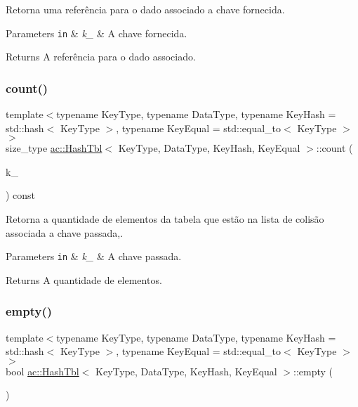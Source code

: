 Retorna uma referência para o dado associado a chave fornecida. 


\begin{DoxyParams}[1]{Parameters}
\mbox{\tt in}  & {\em k\+\_\+} & A chave fornecida.\\
\hline
\end{DoxyParams}
\begin{DoxyReturn}{Returns}
A referência para o dado associado. 
\end{DoxyReturn}
\mbox{\label{classac_1_1HashTbl_ae5dd7b78ebf842dfb67db7005c519479}} 
\subsubsection{\texorpdfstring{count()}{count()}}
{\footnotesize\ttfamily template$<$typename Key\+Type, typename Data\+Type, typename Key\+Hash = std\+::hash$<$ Key\+Type $>$, typename Key\+Equal = std\+::equal\+\_\+to$<$ Key\+Type $>$$>$ \\
size\+\_\+type \hyperlink{classac_1_1HashTbl}{ac\+::\+Hash\+Tbl}$<$ Key\+Type, Data\+Type, Key\+Hash, Key\+Equal $>$\+::count (\begin{DoxyParamCaption}\item[{const Key\+Type}]{k\+\_\+ }\end{DoxyParamCaption}) const\hspace{0.3cm}{\ttfamily [inline]}}



Retorna a quantidade de elementos da tabela que estão na lista de colisão associada a chave passada,. 


\begin{DoxyParams}[1]{Parameters}
\mbox{\tt in}  & {\em k\+\_\+} & A chave passada.\\
\hline
\end{DoxyParams}
\begin{DoxyReturn}{Returns}
A quantidade de elementos. 
\end{DoxyReturn}
\mbox{\label{classac_1_1HashTbl_ae472bbb6b9905b7fb6cb784195fb73ed}} 
\subsubsection{\texorpdfstring{empty()}{empty()}}
{\footnotesize\ttfamily template$<$typename Key\+Type, typename Data\+Type, typename Key\+Hash = std\+::hash$<$ Key\+Type $>$, typename Key\+Equal = std\+::equal\+\_\+to$<$ Key\+Type $>$$>$ \\
bool \hyperlink{classac_1_1HashTbl}{ac\+::\+Hash\+Tbl}$<$ Key\+Type, Data\+Type, Key\+Hash, Key\+Equal $>$\+::empty (\begin{DoxyParamCaption}\item[{void}]{ }\end{DoxyParamCaption})\hspace{0.3cm}{\ttfamily [inline]}}



